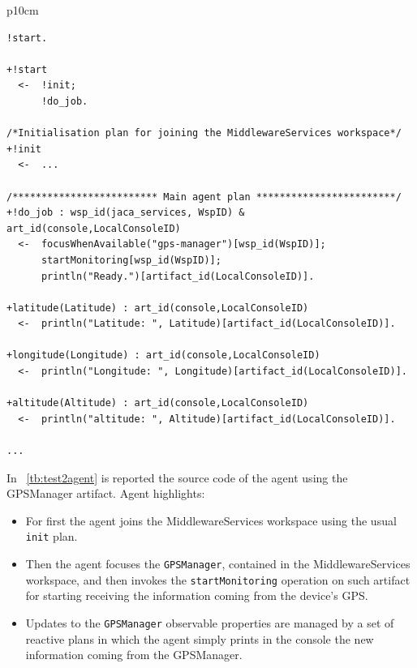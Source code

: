 \documentclass[11pt]{report}
\newcommand\labeltab[1]{\label{tb:#1}}
\newcommand\xt[1]{\tablename~\ref{tb:#1}}
\newcommand\code[1]{{\mbox{\texttt{{#1}}}}}
\newcommand{\jason}{\mbox{\sf{\emph{{Jason}}}}}
\begin{document}
\begin{table}[!ht]
\begin{tabular} {p{10cm}}
\begin{minipage}{10cm}
{\scriptsize \begin{verbatim}
!start.

+!start
  <-  !init;
      !do_job.

/*Initialisation plan for joining the MiddlewareServices workspace*/
+!init 
  <-  ...
	
/************************* Main agent plan ************************/		
+!do_job : wsp_id(jaca_services, WspID) & art_id(console,LocalConsoleID)
  <-  focusWhenAvailable("gps-manager")[wsp_id(WspID)];
      startMonitoring[wsp_id(WspID)];
      println("Ready.")[artifact_id(LocalConsoleID)].
		
+latitude(Latitude) : art_id(console,LocalConsoleID)
  <-  println("Latitude: ", Latitude)[artifact_id(LocalConsoleID)].
  
+longitude(Longitude) : art_id(console,LocalConsoleID)
  <-  println("Longitude: ", Longitude)[artifact_id(LocalConsoleID)].
	
+altitude(Altitude) : art_id(console,LocalConsoleID)
  <-  println("altitude: ", Altitude)[artifact_id(LocalConsoleID)].

...

\end{verbatim}}
\end{minipage}
\end{tabular}
\caption{Source code snippet of the \jason{} agent used in this test.}
    \labeltab{test2agent}
\end{table}

In \xt{test2agent} is reported the source code of the agent using the \textsf{GPSManager} artifact. Agent highlights:
\begin{itemize}
\item For first the agent joins the \textsf{MiddlewareServices} workspace using the usual \code{init} plan.
%
\item Then the agent focuses the \code{GPSManager}, contained in the \textsf{MiddlewareServices} workspace, and then invokes the \code{startMonitoring} operation on such artifact for starting receiving the information coming from the device's GPS.
%
\item Updates to the \code{GPSManager} observable properties are managed by a set of reactive plans in which the agent simply prints in the console the new information coming from the \textsf{GPSManager}.
\end{itemize}
\end{document}
